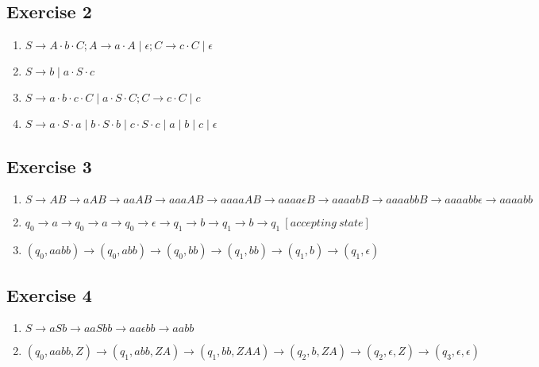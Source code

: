 \documentclass[12pt,fleqn]{article}		%
\begin{document}
\subsection{Exercise 2}
\begin{enumerate}
\item $ S \rightarrow A \cdot b \cdot C; A \rightarrow a \cdot A \mid \epsilon; C \rightarrow c \cdot C \mid \epsilon $
\item $ S \rightarrow b \mid a \cdot S \cdot c $
\item $ S \rightarrow a \cdot b \cdot c \cdot C \mid a \cdot S \cdot C; C \rightarrow c \cdot C \mid c $
\item $ S \rightarrow a \cdot S \cdot a \mid b \cdot S \cdot b \mid c \cdot S \cdot c \mid a \mid b \mid c \mid \epsilon $
\end{enumerate}

\subsection{Exercise 3}
\begin{enumerate}
\item $ S \rightarrow AB \rightarrow aAB \rightarrow aaAB \rightarrow aaaAB \rightarrow aaaaAB \rightarrow aaaa\epsilon{}B \rightarrow aaaabB \rightarrow aaaabbB \rightarrow aaaabb\epsilon \rightarrow aaaabb $
\item $ q_0 \rightarrow a \rightarrow q_0 \rightarrow a \rightarrow q_0 \rightarrow \epsilon \rightarrow q_1 \rightarrow b \rightarrow q_1 \rightarrow b \rightarrow q_1 \ [accepting\ state] $
\item $ (q_0, aabb) \rightarrow (q_0, abb) \rightarrow (q_0, bb) \rightarrow (q_1, bb) \rightarrow (q_1, b) \rightarrow (q_1, \epsilon) $
\end{enumerate}

\subsection{Exercise 4}
\begin{enumerate}
\item $ S \rightarrow aSb \rightarrow aaSbb \rightarrow aa\epsilon{}bb \rightarrow aabb $
\item $ (q_0, aabb, Z) \rightarrow (q_1, abb, ZA) \rightarrow (q_1, bb, ZAA) \rightarrow (q_2, b, ZA) \rightarrow (q_2, \epsilon, Z) \rightarrow (q_3, \epsilon, \epsilon) $
\end{enumerate}
\end{document}
